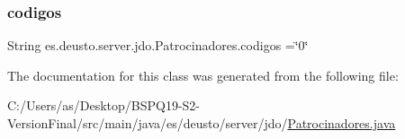 \subsubsection{\texorpdfstring{codigos}{codigos}}
{\footnotesize\ttfamily String es.\+deusto.\+server.\+jdo.\+Patrocinadores.\+codigos =\char`\"{}0\char`\"{}\hspace{0.3cm}{\ttfamily [static]}}



The documentation for this class was generated from the following file\+:\begin{DoxyCompactItemize}
\item 
C\+:/\+Users/as/\+Desktop/\+B\+S\+P\+Q19-\/\+S2-\/\+Version\+Final/src/main/java/es/deusto/server/jdo/\mbox{\hyperlink{_patrocinadores_8java}{Patrocinadores.\+java}}\end{DoxyCompactItemize}
